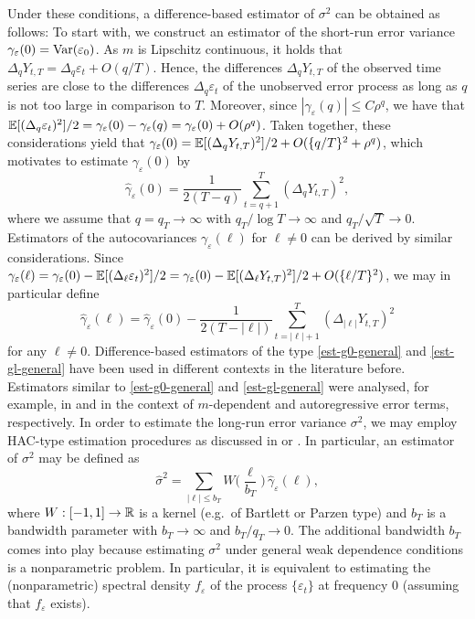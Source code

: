 Under these conditions, a difference-based estimator of $\sigma^2$ can be obtained as follows: To start with, we construct an estimator of the short-run error variance $\gamma_\varepsilon(0) = \textnormal{Var}(\varepsilon_0)$. As $m$ is Lipschitz continuous, it holds that $\Delta_q Y_{t,T} = \Delta_q \varepsilon_t + O(q/T)$. Hence, the differences $\Delta_q Y_{t,T}$ of the observed time series are close to the differences $\Delta_q \varepsilon_t$ of the unobserved error process as long as $q$ is not too large in comparison to $T$. Moreover, since $|\gamma_\varepsilon(q)| \le C \rho^{q}$, we have that $\mathbb{E}[(\Delta_q \varepsilon_t)^2]/2 = \gamma_\varepsilon(0) - \gamma_\varepsilon(q) = \gamma_\varepsilon(0) + O(\rho^q)$. Taken together, these considerations yield that $\gamma_\varepsilon(0) = \mathbb{E}[(\Delta_q Y_{t,T})^2]/2 + O(\{q/T\}^2 + \rho^q)$, which motivates to estimate $\gamma_\varepsilon(0)$ by  
\begin{equation}\label{est-g0-general}
\widehat{\gamma}_\varepsilon(0) = \frac{1}{2(T-q)} \sum\limits_{t=q+1}^T (\Delta_q Y_{t,T})^2,
\end{equation}
where we assume that $q = q_T \rightarrow \infty$ with $q_T/\log T \rightarrow \infty$ and $q_T/\sqrt{T} \rightarrow 0$. Estimators of the autocovariances $\gamma_\varepsilon(\ell)$ for $\ell \ne 0$ can be derived by similar considerations. Since $\gamma_\varepsilon(\ell) = \gamma_\varepsilon(0) - \mathbb{E}[(\Delta_\ell \varepsilon_t)^2]/2 = \gamma_\varepsilon(0) - \mathbb{E}[(\Delta_\ell Y_{t,T})^2]/2 + O(\{\ell/T\}^2)$, we may in particular define  
\begin{equation}\label{est-gl-general}
\widehat{\gamma}_\varepsilon(\ell) = \widehat{\gamma}_\varepsilon(0) - \frac{1}{2(T-|\ell|)} \sum\limits_{t=|\ell|+1}^T (\Delta_{|\ell|} Y_{t,T} )^2
\end{equation}
for any $\ell \ne 0$. Difference-based estimators of the type \eqref{est-g0-general} and \eqref{est-gl-general} have been used in different contexts in the literature before. Estimators similar to \eqref{est-g0-general} and \eqref{est-gl-general} were analysed, for example, in \cite{MuellerStadtmueller1988} and \cite{Hall2003} in the context of $m$-dependent and autoregressive error terms, respectively. In order to estimate the long-run error variance $\sigma^2$, we may employ HAC-type estimation procedures as discussed in \cite{Andrews1991} or \cite{DeJong2000}. In particular, an estimator of $\sigma^2$ may be defined as 
\begin{equation}\label{est-lrv-general}
\widehat{\sigma}^2 = \sum_{|\ell| \le b_T} W \Big( \frac{\ell}{b_T} \Big) \, \widehat{\gamma}_\varepsilon(\ell), 
\end{equation}
where $W: [-1,1] \rightarrow \mathbb{R}$ is a kernel (e.g.\ of Bartlett or Parzen type) and $b_T$ is a bandwidth parameter with $b_T \rightarrow \infty$ and $b_T/q_T \rightarrow 0$. The additional bandwidth $b_T$ comes into play because estimating $\sigma^2$ under general weak dependence conditions is a nonparametric problem. In particular, it is equivalent to estimating the (nonparametric) spectral density $f_\varepsilon$ of the process $\{\varepsilon_t\}$ at frequency $0$ (assuming that $f_\varepsilon$ exists). 


